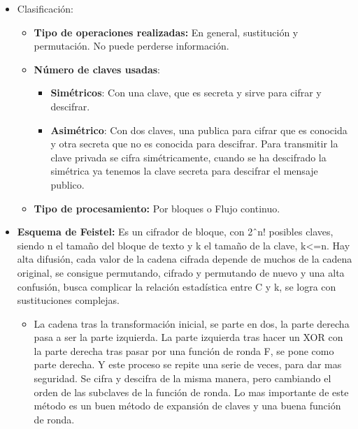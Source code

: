 \documentclass[12pt, twoside, openright]{report} %
\begin{document}
  \begin{itemize}
  \item Clasificación:
    

    \begin{itemize}
    \item \textbf{Tipo de operaciones realizadas:} En general, sustitución y
      permutación. No puede perderse información.
      
    \item \textbf{Número de claves usadas}:
      

      \begin{itemize}
      \item \textbf{Simétricos}: Con una clave, que es secreta y sirve para
        cifrar y descifrar.
        
      \item \textbf{Asimétrico}: Con dos claves, una publica para cifrar que
        es conocida y otra secreta que no es conocida para descifrar.
        Para transmitir la clave privada se cifra simétricamente, cuando
        se ha descifrado la simétrica ya tenemos la clave secreta para
        descifrar el mensaje publico.
        
      \end{itemize}
    \item \textbf{Tipo de procesamiento:} Por bloques o Flujo continuo.
      
    \end{itemize}
  \item \textbf{Esquema de Feistel:} Es un cifrador de bloque, con 2ˆn!
    posibles claves, siendo n el tamaño del bloque de texto y k el
    tamaño de la clave, k\textless=n. Hay alta difusión, cada valor de
    la cadena cifrada depende de muchos de la cadena original, se
    consigue permutando, cifrado y permutando de nuevo y una alta
    confusión, busca complicar la relación estadística entre C y k, se
    logra con sustituciones complejas.
    

    \begin{itemize}
    \item La cadena tras la transformación inicial, se parte en dos, la
      parte derecha pasa a ser la parte izquierda. La parte izquierda
      tras hacer un XOR con la parte derecha tras pasar por una función
      de ronda F, se pone como parte derecha. Y este proceso se repite
      una serie de veces, para dar mas seguridad. Se cifra y descifra de
      la misma manera, pero cambiando el orden de las subclaves de la
      función de ronda. Lo mas importante de este método es un buen
      método de expansión de claves y una buena función de ronda.
      

\end{itemize}
\end{itemize}
\end{document}
